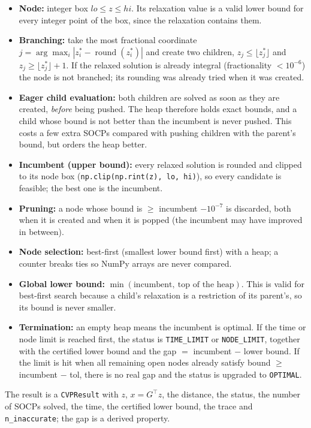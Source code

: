 \documentclass[11pt,a4paper]{article}
\begin{document}
\begin{itemize}
  \item \textbf{Node:} integer box $lo\le z\le hi$. Its relaxation value is a valid lower bound for every integer point of the box, since the relaxation contains them.
  \item \textbf{Branching:} take the most fractional coordinate $j=\arg\max_i |z_i^\ast-\operatorname{round}(z_i^\ast)|$ and create two children, $z_j\le\lfloor z_j^\ast\rfloor$ and $z_j\ge\lfloor z_j^\ast\rfloor+1$. If the relaxed solution is already integral (fractionality $<10^{-6}$) the node is not branched; its rounding was already tried when it was created.
  \item \textbf{Eager child evaluation:} both children are solved as soon as they are created, \emph{before} being pushed. The heap therefore holds exact bounds, and a child whose bound is not better than the incumbent is never pushed. This costs a few extra SOCPs compared with pushing children with the parent's bound, but orders the heap better.
  \item \textbf{Incumbent (upper bound):} every relaxed solution is rounded and clipped to its node box (\texttt{np.clip(np.rint(z), lo, hi)}), so every candidate is feasible; the best one is the incumbent.
  \item \textbf{Pruning:} a node whose bound is $\ge$ incumbent $-10^{-7}$ is discarded, both when it is created and when it is popped (the incumbent may have improved in between).
  \item \textbf{Node selection:} best-first (smallest lower bound first) with a heap; a counter breaks ties so NumPy arrays are never compared.
  \item \textbf{Global lower bound:} $\min(\text{incumbent},\ \text{top of the heap})$. This is valid for best-first search because a child's relaxation is a restriction of its parent's, so its bound is never smaller.
  \item \textbf{Termination:} an empty heap means the incumbent is optimal. If the time or node limit is reached first, the status is \texttt{TIME\_LIMIT} or \texttt{NODE\_LIMIT}, together with the certified lower bound and the gap $=$ incumbent $-$ lower bound. If the limit is hit when all remaining open nodes already satisfy bound $\ge$ incumbent $-$ tol, there is no real gap and the status is upgraded to \texttt{OPTIMAL}.
\end{itemize}

The result is a \texttt{CVPResult} with $z$, $x=G^\top z$, the distance, the status, the number of SOCPs solved, the time, the certified lower bound, the trace and \texttt{n\_inaccurate}; the gap is a derived property.
\end{document}
